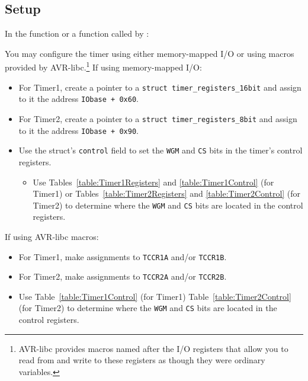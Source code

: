 \subsection{Setup}

In the  function or a function called by :

You may configure the timer using either memory-mapped I/O or using macros
provided by AVR-libc.\footnote{AVR-libc provides macros named after the I/O
registers that allow you to read from and write to these registers as though
they were ordinary variables.} If using memory-mapped I/O:
\begin{itemize}
\item For Timer1, create a pointer to a
    \lstinline{struct timer_registers_16bit} and assign to it the address
    \lstinline{IObase + 0x60}.
\item For Timer2, create a pointer to a
    \lstinline{struct timer_registers_8bit} and assign to it the address
    \lstinline{IObase + 0x90}.
\item Use the struct's \lstinline{control} field to set the \texttt{WGM} and
    \texttt{CS} bits in the timer's control registers.
    \begin{itemize}
    \item Use Tables~\ref{table:Timer1Registers} and \ref{table:Timer1Control}
        (for Timer1) or Tables~\ref{table:Timer2Registers} and
        \ref{table:Timer2Control} (for Timer2) to determine where the
        \texttt{WGM} and \texttt{CS} bits are located in the control registers.
    \end{itemize}
\end{itemize}

If using AVR-libc macros:
\begin{itemize}
\item For Timer1, make assignments to \lstinline{TCCR1A} and/or
    \lstinline{TCCR1B}.
\item For Timer2, make assignments to \lstinline{TCCR2A} and/or
    \lstinline{TCCR2B}.
\item Use Table~\ref{table:Timer1Control} (for Timer1)
    Table~\ref{table:Timer2Control} (for Timer2) to determine where the
    \texttt{WGM} and \texttt{CS} bits are located in the control registers.
\end{itemize}

